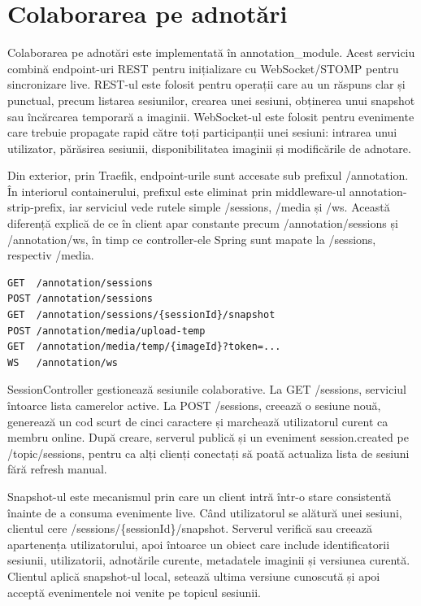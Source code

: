 \section{Colaborarea pe adnotări}

Colaborarea pe adnotări este implementată în annotation\_module. Acest serviciu combină endpoint-uri REST pentru inițializare cu WebSocket/STOMP pentru sincronizare live. REST-ul este folosit pentru operații care au un răspuns clar și punctual, precum listarea sesiunilor, crearea unei sesiuni, obținerea unui snapshot sau încărcarea temporară a imaginii. WebSocket-ul este folosit pentru evenimente care trebuie propagate rapid către toți participanții unei sesiuni: intrarea unui utilizator, părăsirea sesiunii, disponibilitatea imaginii și modificările de adnotare.

Din exterior, prin Traefik, endpoint-urile sunt accesate sub prefixul /annotation. În interiorul containerului, prefixul este eliminat prin middleware-ul annotation-strip-prefix, iar serviciul vede rutele simple /sessions, /media și /ws. Această diferență explică de ce în client apar constante precum /annotation/sessions și /annotation/ws, în timp ce controller-ele Spring sunt mapate la /sessions, respectiv /media.

\begin{verbatim}
GET  /annotation/sessions
POST /annotation/sessions
GET  /annotation/sessions/{sessionId}/snapshot
POST /annotation/media/upload-temp
GET  /annotation/media/temp/{imageId}?token=...
WS   /annotation/ws
\end{verbatim}

SessionController gestionează sesiunile colaborative. La GET /sessions, serviciul întoarce lista camerelor active. La POST /sessions, creează o sesiune nouă, generează un cod scurt de cinci caractere și marchează utilizatorul curent ca membru online. După creare, serverul publică și un eveniment session.created pe /topic/sessions, pentru ca alți clienți conectați să poată actualiza lista de sesiuni fără refresh manual.

Snapshot-ul este mecanismul prin care un client intră într-o stare consistentă înainte de a consuma evenimente live. Când utilizatorul se alătură unei sesiuni, clientul cere /sessions/\{sessionId\}/snapshot. Serverul verifică sau creează apartenența utilizatorului, apoi întoarce un obiect care include identificatorii sesiunii, utilizatorii, adnotările curente, metadatele imaginii și versiunea curentă. Clientul aplică snapshot-ul local, setează ultima versiune cunoscută și apoi acceptă evenimentele noi venite pe topicul sesiunii.

